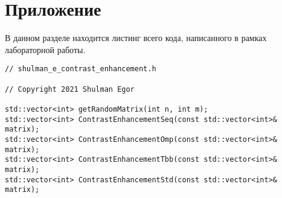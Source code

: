 \documentclass{report}
\begin{document}
\section*{Приложение}
В данном разделе находится листинг всего кода, написанного в рамках лабораторной работы.
\begin{lstlisting}
// shulman_e_contrast_enhancement.h

// Copyright 2021 Shulman Egor

std::vector<int> getRandomMatrix(int n, int m);
std::vector<int> ContrastEnhancementSeq(const std::vector<int>& matrix);
std::vector<int> ContrastEnhancementOmp(const std::vector<int>& matrix);
std::vector<int> ContrastEnhancementTbb(const std::vector<int>& matrix);
std::vector<int> ContrastEnhancementStd(const std::vector<int>& matrix);

\end{lstlisting}
\newpage
\end{document}
